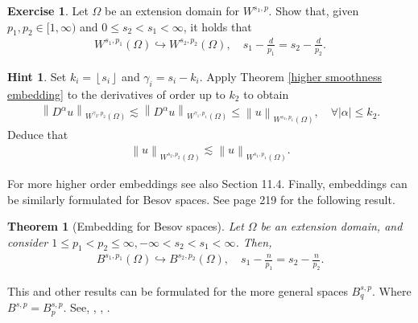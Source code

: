 \documentclass[
    a4paper,
    DIV=14,
    abstract=true,
    numbers=noenddot
]
{scrartcl}
\newtheorem{theorem}{Theorem}[section]
\newtheorem{definition}[theorem]{Definition}
\theoremstyle{definition}
\newtheorem{exercise}{Exercise}
\newtheorem*{hint}{Hint}
\newcommand{\set}[1]{\left\{#1\right\}}
\renewcommand{\norm}[1]{\left\lVert #1 \right\rVert}\renewcommand{\abs}[1]{\left| #1 \right|}
\renewcommand{\d}{\,\mathrm{d}}\newcommand{\dx}{\,\mathrm{d}x}
\newcommand{\N}{\mathbb{N}}
\newcommand{\R}{\mathbb{R}}
\newcommand{\Dd}{\mathcal{D}}
\newcommand{\Ww}{\mathcal{W}}
\begin{document}
\begin{exercise}
    Let $\Omega $ be an extension domain for $W^{s_1,p}$. Show that, given $p_1, p_2 \in [1,\infty)$ and $0 \leq s_2<s_1 <\infty$, it holds that
    \begin{align*}
        W^{s_1, p_1}(\Omega ) \hookrightarrow W^{s_2, p_2}(\Omega ), \quad s_1 - \frac{d}{p_1} = s_2 - \frac{d}{p_2}.
    \end{align*}
\end{exercise}
\begin{hint}
    Set $k_i =\left\lfloor s_i \right\rfloor$ and $\gamma_i =s_i-k_i$.  Apply Theorem \ref{higher smoothness embedding} to the derivatives of order up to $k_2$ to obtain
    \begin{align*}
        \norm{D^\alpha u}_{W^{\gamma_2, p_2}(\Omega )}\lesssim \norm{D^\alpha u}_{W^{\gamma _1,p_1}(\Omega )} \leq \norm{u}_{W^{s_1,p_1}(\Omega )}, \quad \forall \abs{\alpha}\leq k_2.
    \end{align*}
    Deduce that
    \begin{align*}
        \norm{u}_{W^{s_2,p_2}(\Omega )}\lesssim \norm{u}_{W^{s_1,p_1}(\Omega )}.
    \end{align*}
\end{hint}
For more higher order embeddings see also \cite{leoni2023first} Section 11.4. Finally, embeddings can be similarly formulated for Besov spaces. See \cite{sawano2018theory} page 219 for the following result.

\begin{theorem}[Embedding for Besov spaces] Let $\Omega $ be an extension domain, and consider $1 \leq p_1<p_2 \leq \infty, - \infty <s_2<s_1<\infty$. Then,
    \begin{align*}
        B^{s_1,p_1}(\Omega) \hookrightarrow B^{s_2,p_2}(\Omega), \quad s_1-\frac{n}{p_1}=s_2-\frac{n}{p_2} .
    \end{align*}
\end{theorem}
This and other results can be formulated for the more general spaces $B^{s,p}_q$. Where $B^{s,p}= B^{s,p}_p$. See, \cite{triebel1992theory}, \cite{agranovich2015sobolev}, \cite{sawano2018theory}.
\end{document}
